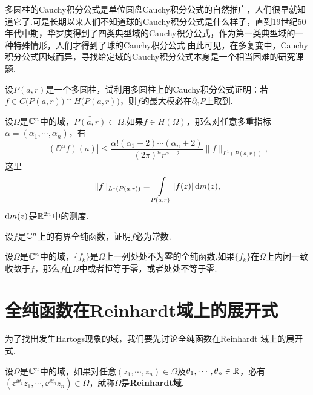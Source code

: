多圆柱的Cauchy积分公式是单位圆盘Cauchy积分公式的自然推广，人们很早就知道它了.可是长期以来人们不知道球的Cauchy积分公式是什么样子，直到19世纪50年代中期，华罗庚得到了四类典型域的Cauchy积分公式，作为第一类典型域的一种特殊情形，人们才得到了球的Cauchy积分公式.由此可见，在多复变中，Cauchy积分公式因域而异，寻找给定域的Cauchy积分公式本身是一个相当困难的研究课题.
\begin{xiti}
  \item 设$P(a,r)$是一个多圆柱，试利用多圆柱上的Cauchy积分公式证明：若$f\in C\big(\bar{P(a,r)}\big)\cap H\big(P(a,r)\big)$，则$f$的最大模必在$\partial_0P$上取到.
  \item 设$\Omega$是$\mathbb C^n$中的域，$\bar{P(a,r)}\subset\Omega$.如果$f\in H(\Omega)$，那么对任意多重指标$\alpha=(\alpha_1,\cdots,\alpha_n)$，有
      \[
        |(\DD^\alpha f)(a)| \le \frac{\alpha!(\alpha_1+2)\cdots(\alpha_n+2)}{(2\pi)^nr^{\alpha+2}}\|f\|
         _{L^1(P(a,r))},
      \]
     这里
     \[
       \|f\|_{L^1(P(a,r))} = \int\limits_{P(a,r)}|f(z)|\mathop{}\!\mathrm{d} m(z),
     \]
     $\mathop{}\!\mathrm{d} m(z)$是$\mathbb R^{2n}$中的测度.
  \item 设$f$是$\mathbb C^n$上的有界全纯函数，证明$f$必为常数.
  \item 设$\Omega$是$\mathbb C^n$中的域，$\{f_k\}$是$\Omega$上一列处处不为零的全纯函数.如果$\{f_k\}$在$\Omega$上内闭一致收敛于$f$，那么$f$在$\Omega$中或者恒等于零，或者处处不等于零.
\end{xiti}

\section{全纯函数在Reinhardt域上的展开式\label{sec9.3}}
为了找出发生Hartogs现象的域，我们要先讨论全纯函数在Reinhardt 域上的展开式.

\begin{definition}\label{def9.3.1}
  设$\Omega$是$\mathbb C^n$中的域，如果对任意$(z_1,\cdots,z_n)\in\Omega$及$\theta_1,\cdots,\theta_n\in\mathbb R$，必有$(\ee^{\ii\theta_1}z_1,\cdots,\ee^{\ii\theta_n}z_n)\in\Omega$，就称$\Omega$是\textbf{Reinhardt域}.
\end{definition}

